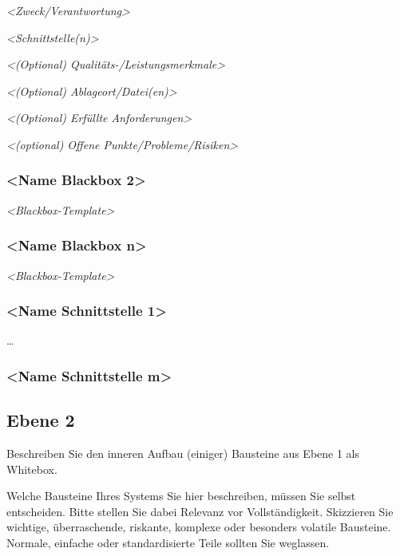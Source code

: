 \documentclass[
]{article}
\begin{document}
\emph{\textless Zweck/Verantwortung\textgreater{}}

\emph{\textless Schnittstelle(n)\textgreater{}}

\emph{\textless(Optional) Qualitäts-/Leistungsmerkmale\textgreater{}}

\emph{\textless(Optional) Ablageort/Datei(en)\textgreater{}}

\emph{\textless(Optional) Erfüllte Anforderungen\textgreater{}}

\emph{\textless(optional) Offene Punkte/Probleme/Risiken\textgreater{}}

\subsubsection{\textless Name Blackbox
2\textgreater{}}\label{_name_blackbox_2}

\emph{\textless Blackbox-Template\textgreater{}}

\subsubsection{\textless Name Blackbox
n\textgreater{}}\label{_name_blackbox_n}

\emph{\textless Blackbox-Template\textgreater{}}

\subsubsection{\textless Name Schnittstelle
1\textgreater{}}\label{_name_schnittstelle_1}

\ldots\hspace{0pt}

\subsubsection{\textless Name Schnittstelle
m\textgreater{}}\label{_name_schnittstelle_m}

\subsection{Ebene 2}\label{_ebene_2}

Beschreiben Sie den inneren Aufbau (einiger) Bausteine aus Ebene 1 als
Whitebox.

Welche Bausteine Ihres Systems Sie hier beschreiben, müssen Sie selbst
entscheiden. Bitte stellen Sie dabei Relevanz vor Vollständigkeit.
Skizzieren Sie wichtige, überraschende, riskante, komplexe oder
besonders volatile Bausteine. Normale, einfache oder standardisierte
Teile sollten Sie weglassen.
\end{document}
